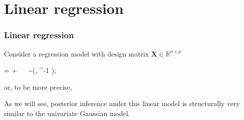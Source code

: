 \documentclass[18pt, handout]{beamer}
\newcommand{\defineTightItemizeSpacing}{%
	\setlength{\abovedisplayskip}{.25\baselineskip}%
	\setlength{\belowdisplayskip}{.25\baselineskip}%
}
\newenvironment{tightEquation*}{%
	\defineTightItemizeSpacing%
	\begin{equation*}
}{
	\end{equation*} \ignorespacesafterend
}
\newcommand{\given}{\thinnerspace | \thinnerspace}
\newcommand{\thinnerspace}{\mskip.5\thinmuskip}
\newcommand{\normalDist}{\mathcal{N}}
\newcommand{\bX}{\bm{X}}
\begin{document}
\section{Linear regression}

\newcommand{\bx}{\bm{x}}
\newcommand{\bbeta}{\bm{\beta}}
\newcommand{\bPhi}{\bm{\Phi}}
\newcommand{\bSigma}{\bm{\Sigma}}
\newcommand{\minus}{\scalebox{1.0}[1.0]{{\scriptsize -}}}
\newcommand{\nPred}{p}
\begin{frame}
\frametitle{Linear regression}
Consider a regression model with design matrix $\bX \in \mathbb{R}^{n \times \nPred}$
\begin{tightEquation*}
 = \bX \bbeta + \bm{\epsilon} 
	\  \,
	\bm{\epsilon} \sim \normalDist\!\left(, \phi^{-1}  \right);
\end{tightEquation*}
or, to be more precise, 

As we will see, posterior inference under this linear model is structurally very similar to the univariate Gaussian model.
\end{frame}
\end{document}
